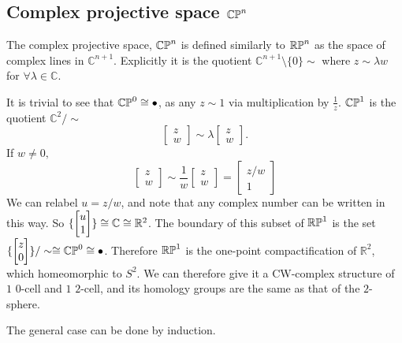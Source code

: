 \subsection{Complex projective space $\mathbb{CP}^{n}$}\label{sec-complex-projective-space}
The complex projective space, $\mathbb{CP}^{n}$ is defined similarly to $\mathbb{RP}^{n}$ as the space of complex lines in $\mathbb{C}^{n+1}$. Explicitly it is the quotient $\mathbb{C}^{n+1}\setminus \{0\}  \sim$ where $z\sim \lambda w$ for $\forall\lambda \in \mathbb{C}$.

It is trivial to see that $\mathbb{CP}^{0}\cong\bullet$, as any $z\sim 1$ via multiplication by $\frac{1}{z}$. $\mathbb{CP}^{1}$ is the quotient $\mathbb{C}^2/\sim$
$$\begin{bmatrix} z\\ w \end{bmatrix}\sim \lambda \begin{bmatrix} z\\ w \end{bmatrix}.$$
If $w\neq 0,$ $$\begin{bmatrix} z\\ w\end{bmatrix}\sim \frac{1}{w}\begin{bmatrix} z\\ w\end{bmatrix}=\begin{bmatrix} z/w\\ 1\end{bmatrix}$$ We can relabel $u=z/w$, and note that any complex number can be written in this way. So $\{\begin{bmatrix} u\\ 1\end{bmatrix}\}\cong \mathbb{C}\cong \mathbb{R}^2$. The boundary of this subset of $\mathbb{RP}^{1}$ is the set $\{\begin{bmatrix} z\\ 0\end{bmatrix}\}/\sim\cong \mathbb{CP}^{0}\cong\bullet$. Therefore $\mathbb{RP}^{1}$ is the one-point compactification of $\mathbb{R}^2$, which homeomorphic to $S^2$. We can therefore give it a CW-complex structure of $1$ $0$-cell and $1$ $2$-cell, and its homology groups are the same as that of the $2$-sphere.

The general case can be done by induction.

